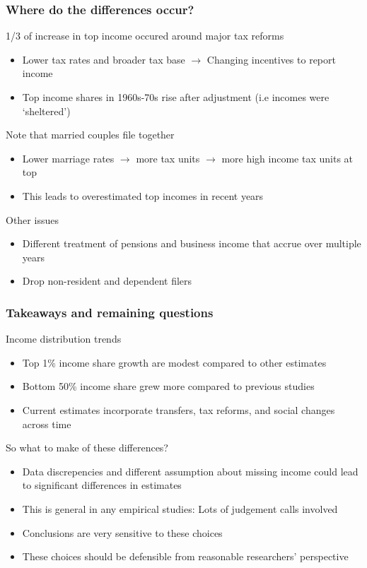 \documentclass[aspectratio=169]{beamer}
\begin{document}
\begin{frame}
\frametitle{Where do the differences occur?}
1/3 of increase in top income occured around major tax reforms 
\begin{itemize}\setlength\itemsep{3pt}
\item Lower tax rates and broader tax base $\to$ Changing incentives to report income
\item Top income shares in 1960s-70s rise after adjustment (i.e incomes were `sheltered')
\end{itemize} \medskip
Note that married couples file together
\begin{itemize}\setlength\itemsep{3pt}
\item Lower marriage rates $\to$ more tax units $\to$ more high income tax units at top
\item This leads to overestimated top incomes in recent years
\end{itemize}\medskip
Other issues
\begin{itemize}
 \item Different treatment of pensions and business income that accrue over multiple years
 \item Drop non-resident and dependent filers
\end{itemize}
\end{frame}


\begin{frame}
\frametitle{Takeaways and remaining questions} 
Income distribution trends
\begin{itemize}\setlength\itemsep{3pt}
\item Top 1\% income share growth are modest compared to other estimates
\item Bottom 50\% income share grew more compared to previous studies
\item Current estimates incorporate transfers, tax reforms, and social changes across time
\end{itemize}\medskip
So what to make of these differences?
\begin{itemize}\setlength\itemsep{3pt}
\item Data discrepencies and different assumption about missing income could lead to significant differences in estimates
\item This is general in any empirical studies: Lots of judgement calls involved
\item Conclusions are very sensitive to these choices
\item These choices should be defensible from reasonable researchers' perspective
\end{itemize}\medskip
\end{frame}
\end{document}
